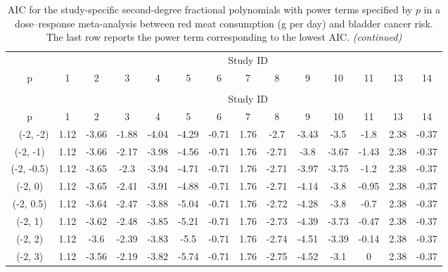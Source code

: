 \documentclass[11pt,a4paper,twoside,openany]{book}\usepackage{knitr}
\begin{document}
{{\begin{knitrout}\footnotesize
{}\color{fgcolor}
\begin{landscape}
\begin{longtable}[t]{cccccccccccccc}
\caption{\label{tab:AIC_pi_red}AIC for the study-specific second-degree fractional polynomials with power terms specified by $p$ in a dose--response meta-analysis between red meat consumption (g per day) and bladder cancer risk. The last row reports the power term corresponding to the lowest AIC.}\\
\toprule
\multicolumn{ 1}{c}{ } & \multicolumn{13}{c}{Study ID} \\
\cmidrule(l{2pt}r{2pt}){2-14}
p & 1 & 2 & 3 & 4 & 5 & 6 & 7 & 8 & 9 & 10 & 11 & 13 & 14\\
\midrule
\endfirsthead
\caption[]{AIC for the study-specific second-degree fractional polynomials with power terms specified by $p$ in a dose--response meta-analysis between red meat consumption (g per day) and bladder cancer risk. The last row reports the power term corresponding to the lowest AIC. \textit{(continued)}}\\
\toprule
\multicolumn{ 1}{c}{ } & \multicolumn{13}{c}{Study ID} \\
\cmidrule(l{2pt}r{2pt}){2-14}
p & 1 & 2 & 3 & 4 & 5 & 6 & 7 & 8 & 9 & 10 & 11 & 13 & 14\\
\midrule
\endhead
\
\endfoot
\bottomrule
\endlastfoot
(-2, -2) & 1.12 & -3.66 & -1.88 & -4.04 & -4.29 & -0.71 & 1.76 & -2.7 & -3.43 & -3.5 & -1.8 & 2.38 & -0.37\\
(-2, -1) & 1.12 & -3.66 & -2.17 & -3.98 & -4.56 & -0.71 & 1.76 & -2.71 & -3.8 & -3.67 & -1.43 & 2.38 & -0.37\\
(-2, -0.5) & 1.12 & -3.65 & -2.3 & -3.94 & -4.71 & -0.71 & 1.76 & -2.71 & -3.97 & -3.75 & -1.2 & 2.38 & -0.37\\
(-2, 0) & 1.12 & -3.65 & -2.41 & -3.91 & -4.88 & -0.71 & 1.76 & -2.71 & -4.14 & -3.8 & -0.95 & 2.38 & -0.37\\
(-2, 0.5) & 1.12 & -3.64 & -2.47 & -3.88 & -5.04 & -0.71 & 1.76 & -2.72 & -4.28 & -3.8 & -0.7 & 2.38 & -0.37\\
(-2, 1) & 1.12 & -3.62 & -2.48 & -3.85 & -5.21 & -0.71 & 1.76 & -2.73 & -4.39 & -3.73 & -0.47 & 2.38 & -0.37\\
(-2, 2) & 1.12 & -3.6 & -2.39 & -3.83 & -5.5 & -0.71 & 1.76 & -2.74 & -4.51 & -3.39 & -0.14 & 2.38 & -0.37\\
(-2, 3) & 1.12 & -3.56 & -2.19 & -3.82 & -5.74 & -0.71 & 1.76 & -2.75 & -4.52 & -3.1 & 0 & 2.38 & -0.37\\

\end{longtable}
\end{landscape}
\end{knitrout}}}
\end{document}
